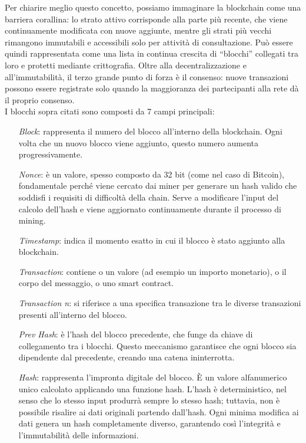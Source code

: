 Per chiarire meglio questo concetto, possiamo immaginare la blockchain come una barriera corallina: lo strato attivo corrisponde alla parte più recente, che viene continuamente modificata con nuove aggiunte, mentre gli strati più vecchi rimangono immutabili e accessibili solo per attività di consultazione.
Può essere quindi rappresentata come una lista in continua crescita di “blocchi” collegati tra loro e protetti mediante crittografia. Oltre alla decentralizzazione e all’immutabilità, il terzo grande punto di forza è il consenso: nuove transazioni possono essere registrate solo quando la maggioranza dei partecipanti alla rete dà il proprio consenso. \\
I blocchi sopra citati sono composti da 7 campi principali: 
\begin{itemize}
    \item[\textit{Block}:]  rappresenta il numero del blocco all'interno della blockchain. Ogni volta che un nuovo blocco viene aggiunto, questo numero aumenta progressivamente.
    \item[\textit{Nonce}:]  è un valore, spesso composto da 32 bit (come nel caso di Bitcoin), fondamentale perché viene cercato dai miner per generare un hash valido che soddisfi i requisiti di difficoltà della chain. Serve a modificare l’input del calcolo dell’hash e viene aggiornato continuamente durante il processo di mining.
    \item [\textit{Timestamp}:] indica il momento esatto in cui il blocco è stato aggiunto alla blockchain.
    \item [\textit{Transaction}:] contiene o un valore (ad esempio un importo monetario), o il corpo del messaggio, o uno smart contract.
    \item [\textit{Transaction n}:] si riferisce a una specifica transazione tra le diverse transazioni presenti all’interno del blocco.
    \item [\textit{Prev Hash}:] è l’hash del blocco precedente, che funge da chiave di collegamento tra i blocchi. Questo meccanismo garantisce che ogni blocco sia dipendente dal precedente, creando una catena ininterrotta.
    \item [\textit{Hash}:] rappresenta l’impronta digitale del blocco. È un valore alfanumerico unico calcolato applicando una funzione hash. L’hash è deterministico, nel senso che lo stesso input produrrà sempre lo stesso hash; tuttavia, non è possibile risalire ai dati originali partendo dall’hash. Ogni minima modifica ai dati genera un hash completamente diverso, garantendo così l’integrità e l’immutabilità delle informazioni.
\end{itemize}

